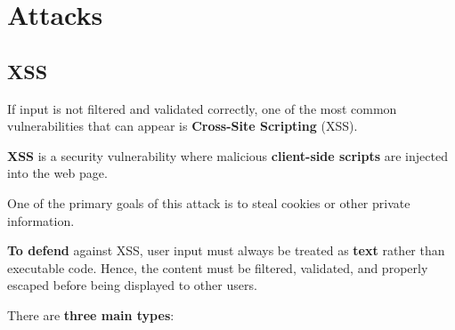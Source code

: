 \documentclass{article}
\begin{document}
\section{Attacks}

\subsection{XSS}

If input is not filtered and validated correctly, one of the most common vulnerabilities that can appear is \textbf{Cross-Site Scripting} (XSS).

\textbf{XSS} is a security vulnerability where malicious \textbf{client-side scripts} are injected into the web page.

One of the primary goals of this attack is to steal cookies or other private information.

\textbf{To defend} against XSS, user input must always be treated as \textbf{text} rather than executable code. Hence, the content must be filtered, validated, and properly escaped before being displayed to other users.

There are \textbf{three main types}:
\end{document}
